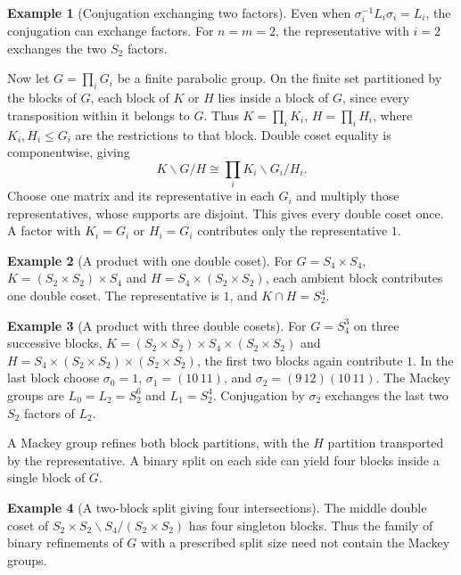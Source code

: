\documentclass[11pt,a4paper]{article}
\numberwithin{equation}{section}
\theoremstyle{definition}
\newtheorem{example}{Example}[section]
\begin{document}
\begin{example}[Conjugation exchanging two factors]\label{ex:two-block-factor-exchange}
Even when \(\sigma_i^{-1}L_i\sigma_i=L_i\), the conjugation can
exchange factors. For \(n=m=2\), the representative with \(i=2\)
exchanges the two \(S_2\) factors.
\end{example}

Now let \(G=\prod_i G_i\) be a finite parabolic group.
On the finite set partitioned by the blocks of \(G\), each block
of \(K\) or \(H\) lies inside a block of \(G\), since every
transposition within it belongs to \(G\). Thus
\(K=\prod_i K_i\), \(H=\prod_i H_i\), where \(K_i,H_i\le G_i\)
are the restrictions to that block. Double coset equality is
componentwise, giving
\[
 K\backslash G/H \cong \prod_i K_i\backslash G_i/H_i .
\]
Choose one matrix and its representative in each \(G_i\) and
multiply those representatives, whose supports are disjoint.
This gives every double coset once. A factor with \(K_i=G_i\)
or \(H_i=G_i\) contributes only the representative \(1\).


\begin{example}[A product with one double coset]\label{ex:product-two-factors}
For \(G=S_4\times S_4\), \(K=(S_2\times S_2)\times S_4\) and
\(H=S_4\times(S_2\times S_2)\), each ambient block contributes
one double coset. The representative is \(1\), and
\(K\cap H=S_2^4\).
\end{example}


\begin{example}[A product with three double cosets]\label{ex:product-three-factors}
For \(G=S_4^3\) on three successive blocks,
\(K=(S_2\times S_2)\times S_4\times(S_2\times S_2)\) and
\(H=S_4\times(S_2\times S_2)\times(S_2\times S_2)\), the first
two blocks again contribute \(1\). In the last block choose
\(\sigma_0=1\), \(\sigma_1=(10\,11)\), and
\(\sigma_2=(9\,12)(10\,11)\). The Mackey groups are
\(L_0=L_2=S_2^6\) and \(L_1=S_2^4\). Conjugation by \(\sigma_2\)
exchanges the last two \(S_2\) factors of \(L_2\).
\end{example}

A Mackey group refines both block partitions, with the \(H\)
partition transported by the representative. A binary split on
each side can yield four blocks inside a single block of \(G\).


\begin{example}[A two-block split giving four intersections]\label{ex:four-intersections}
The middle double coset of
\(S_2\times S_2\backslash S_4/(S_2\times S_2)\) has four
singleton blocks. Thus the family of binary refinements of \(G\)
with a prescribed split size need not contain the Mackey groups.
\end{example}
\end{document}
